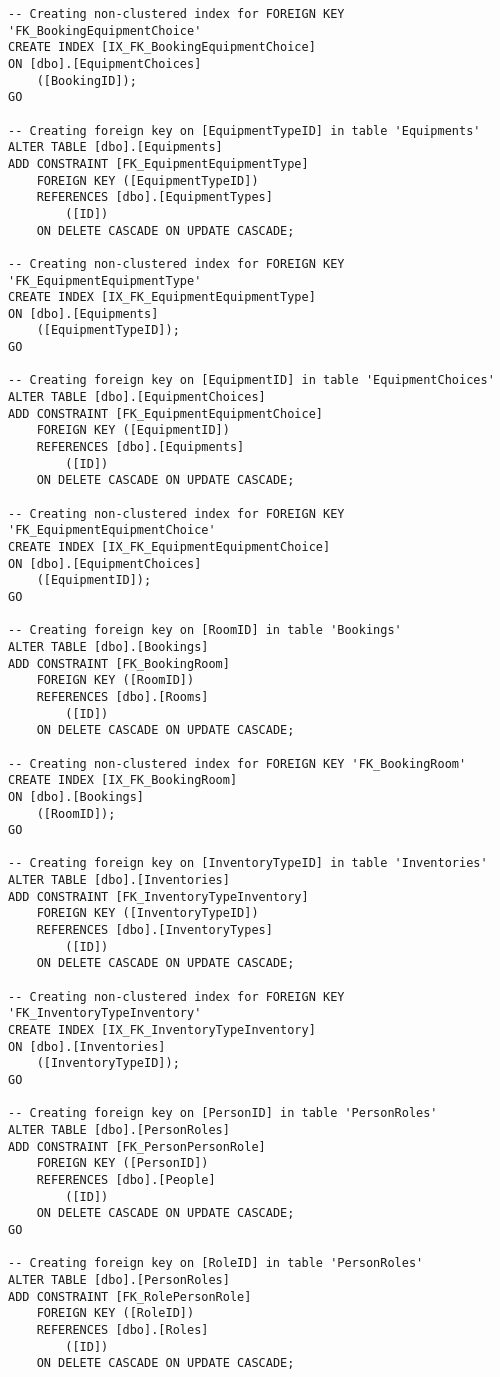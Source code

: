 \begin{lstlisting}[label=SQL, caption= SQL-kode til oprettelse af database]
-- Creating non-clustered index for FOREIGN KEY 'FK_BookingEquipmentChoice'
CREATE INDEX [IX_FK_BookingEquipmentChoice]
ON [dbo].[EquipmentChoices]
    ([BookingID]);
GO

-- Creating foreign key on [EquipmentTypeID] in table 'Equipments'
ALTER TABLE [dbo].[Equipments]
ADD CONSTRAINT [FK_EquipmentEquipmentType]
    FOREIGN KEY ([EquipmentTypeID])
    REFERENCES [dbo].[EquipmentTypes]
        ([ID])
    ON DELETE CASCADE ON UPDATE CASCADE;

-- Creating non-clustered index for FOREIGN KEY 'FK_EquipmentEquipmentType'
CREATE INDEX [IX_FK_EquipmentEquipmentType]
ON [dbo].[Equipments]
    ([EquipmentTypeID]);
GO

-- Creating foreign key on [EquipmentID] in table 'EquipmentChoices'
ALTER TABLE [dbo].[EquipmentChoices]
ADD CONSTRAINT [FK_EquipmentEquipmentChoice]
    FOREIGN KEY ([EquipmentID])
    REFERENCES [dbo].[Equipments]
        ([ID])
    ON DELETE CASCADE ON UPDATE CASCADE;

-- Creating non-clustered index for FOREIGN KEY 'FK_EquipmentEquipmentChoice'
CREATE INDEX [IX_FK_EquipmentEquipmentChoice]
ON [dbo].[EquipmentChoices]
    ([EquipmentID]);
GO

-- Creating foreign key on [RoomID] in table 'Bookings'
ALTER TABLE [dbo].[Bookings]
ADD CONSTRAINT [FK_BookingRoom]
    FOREIGN KEY ([RoomID])
    REFERENCES [dbo].[Rooms]
        ([ID])
    ON DELETE CASCADE ON UPDATE CASCADE;

-- Creating non-clustered index for FOREIGN KEY 'FK_BookingRoom'
CREATE INDEX [IX_FK_BookingRoom]
ON [dbo].[Bookings]
    ([RoomID]);
GO

-- Creating foreign key on [InventoryTypeID] in table 'Inventories'
ALTER TABLE [dbo].[Inventories]
ADD CONSTRAINT [FK_InventoryTypeInventory]
    FOREIGN KEY ([InventoryTypeID])
    REFERENCES [dbo].[InventoryTypes]
        ([ID])
    ON DELETE CASCADE ON UPDATE CASCADE;

-- Creating non-clustered index for FOREIGN KEY 'FK_InventoryTypeInventory'
CREATE INDEX [IX_FK_InventoryTypeInventory]
ON [dbo].[Inventories]
    ([InventoryTypeID]);
GO

-- Creating foreign key on [PersonID] in table 'PersonRoles'
ALTER TABLE [dbo].[PersonRoles]
ADD CONSTRAINT [FK_PersonPersonRole]
    FOREIGN KEY ([PersonID])
    REFERENCES [dbo].[People]
        ([ID])
    ON DELETE CASCADE ON UPDATE CASCADE;
GO

-- Creating foreign key on [RoleID] in table 'PersonRoles'
ALTER TABLE [dbo].[PersonRoles]
ADD CONSTRAINT [FK_RolePersonRole]
    FOREIGN KEY ([RoleID])
    REFERENCES [dbo].[Roles]
        ([ID])
    ON DELETE CASCADE ON UPDATE CASCADE;


\end{lstlisting}
